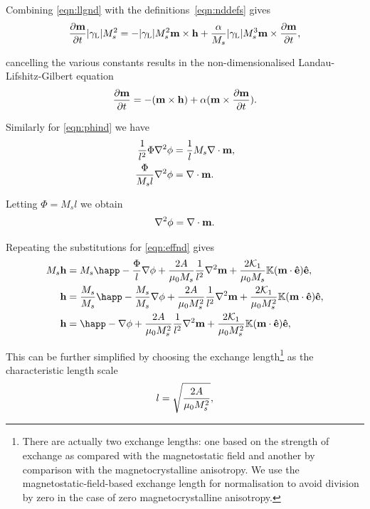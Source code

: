 Combining \cref{eqn:llgnd} with the definitions~\cref{eqn:nddefs} gives
\begin{equation}
   \frac{\partial \boldsymbol{\mathrm{m}}}{\partial t} {\left|{\gamma_{\mathrm{\tiny{L}}}} \right|} M_s^2 =
  - {\left|{\gamma_{\mathrm{\tiny{L}}}} \right|} M_s^2 \boldsymbol{\mathrm{m}} \times \boldsymbol{\mathrm{h}} + \frac{\alpha}{M_s} {\left|{\gamma_{\mathrm{\tiny{L}}}} \right|} M_s^3 \boldsymbol{\mathrm{m}} \times \frac{\partial \boldsymbol{\mathrm{m}}}{\partial t},
\end{equation}

cancelling the various constants results in the non-dimensionalised Landau-Lifshitz-Gilbert equation
\begin{equation}
  \label{eq:53}
  \frac{\partial \boldsymbol{\mathrm{m}}}{\partial t} = - (\boldsymbol{\mathrm{m}} \times \boldsymbol{\mathrm{h}}) + \alpha (\boldsymbol{\mathrm{m}} \times \frac{\partial \boldsymbol{\mathrm{m}}}{\partial t}).
\end{equation}

Similarly for \cref{eqn:phind} we have
\begin{align*}
  \frac{1}{l^2} \Phi \nabla^2 \phi &= \frac{1}{l} M_s \nabla \cdot \boldsymbol{\mathrm{m}}, \\
  \frac{\Phi}{M_s l} \nabla^2 \phi &= \nabla \cdot \boldsymbol{\mathrm{m}}.
\end{align*}

Letting $\Phi = M_s l$ we obtain
\begin{equation}
  \label{eq:57}
  \nabla^2 \phi = \nabla \cdot \boldsymbol{\mathrm{m}}.
\end{equation}

Repeating the substitutions for \cref{eqn:effnd} gives
\begin{align*}
  M_s \hv &= M_s \happ - \frac{\Phi}{l} \grad \phi + \frac{2 \Exchc }{\mu_0 M_s} \frac{1}{l^2} \lap \mv + \frac{2\kone}{\mu_0 M_s}  \nK (\mv \cdot \ev) \ev, \\
  \hv &= \frac{M_s}{M_s} \happ - \frac{M_s}{M_s} \grad \phi + \frac{2 \Exchc}{\mu_0 M_s^2} \frac{1}{l^2} \lap \mv + \frac{2\kone}{\mu_0 M_s^2} \nK (\mv \cdot \ev) \ev, \\
  \hv &= \happ - \grad \phi + \frac{2 \Exchc}{\mu_0 M_s^2} \frac{1}{l^2} \lap \mv + \frac{2\kone}{\mu_0 M_s^2} \nK (\mv \cdot \ev) \ev, \\
\end{align*}

This can be further simplified by choosing the exchange length\footnote{There are actually two exchange lengths: one based on the strength of exchange as compared with the magnetostatic field and another by comparison with the magnetocrystalline anisotropy. We use the magnetostatic-field-based exchange length for normalisation to avoid division by zero in the case of zero magnetocrystalline anisotropy.} as the characteristic length scale
\begin{equation}
  \label{eqn:l-normalisation}
  l = \sqrt{ \frac{2 A}{\mu_0 M_s^2} },
\end{equation}

